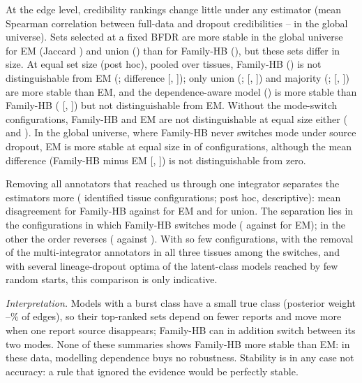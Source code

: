 At the edge level, credibility rankings change little under any estimator (mean Spearman correlation between full-data and dropout credibilities \nRobSpMin{}--\nRobSpMax{} in the global universe).
Sets selected at a fixed BFDR are more stable in the global universe for EM (Jaccard \nRobJacBfdrEm{}) and union (\nRobJacBfdrUnion{}) than for Family-HB (\nRobJacBfdrHb{}), but these sets differ in size.
At equal set size (post hoc), pooled over tissues, Family-HB (\nRobSmHb{}) is not distinguishable from EM (\nRobSmEm{}; difference \nRobSmCtHbEm{} [\nRobSmCtHbEmLo{}, \nRobSmCtHbEmHi{}]); only union (\nRobSmUnion{}; \nRobSmCtUnionEm{} [\nRobSmCtUnionEmLo{}, \nRobSmCtUnionEmHi{}]) and majority (\nRobSmMaj{}; \nRobSmCtMajEm{} [\nRobSmCtMajEmLo{}, \nRobSmCtMajEmHi{}]) are more stable than EM, and the dependence-aware model (\nRobSmDep{}) is more stable than Family-HB (\nRobSmCtDepHb{} [\nRobSmCtDepHbLo{}, \nRobSmCtDepHbHi{}]) but not distinguishable from EM.
Without the \nRobNswitch{} mode-switch configurations, Family-HB and EM are not distinguishable at equal size either (\nRobSmHbNs{} and \nRobSmEmNs{}).
In the global universe, where Family-HB never switches mode under source dropout, EM is more stable at equal size in \nRobSmGlobNEm{} of \nRobSmGlobN{} configurations, although the mean difference (Family-HB minus EM \nRobSmCtHbEmGlob{} [\nRobSmCtHbEmGlobLo{}, \nRobSmCtHbEmGlobHi{}]) is not distinguishable from zero.

Removing all annotators that reached us through one integrator separates the estimators more (\nRobLinN{} identified tissue configurations; post hoc, descriptive): mean disagreement \nRobLinHb{} for Family-HB against \nRobLinEm{} for EM and \nRobLinUnion{} for union.
The separation lies in the \nRobLinNSw{} configurations in which Family-HB switches mode (\nRobLinHbSw{} against \nRobLinEmSw{} for EM); in the other \nRobLinNs{} the order reverses (\nRobLinHbNs{} against \nRobLinEmNs{}).
With so few configurations, with the removal of the multi-integrator annotators in all three tissues among the switches, and with several lineage-dropout optima of the latent-class models reached by few random starts, this comparison is only indicative.

\emph{Interpretation.} Models with a burst class have a small true class (posterior weight \nWtPctMin{}--\nWtPctMax{}\% of edges), so their top-ranked sets depend on fewer reports and move more when one report source disappears; Family-HB can in addition switch between its two modes.
None of these summaries shows Family-HB more stable than EM: in these data, modelling dependence buys no robustness.
Stability is in any case not accuracy: a rule that ignored the evidence would be perfectly stable.


